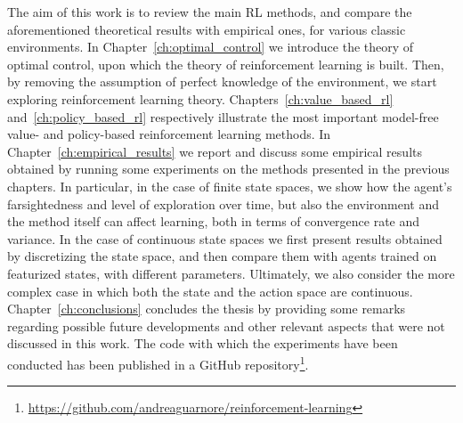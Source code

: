 The aim of this work is to review the main RL methods, and compare the aforementioned theoretical results with empirical ones, for various classic environments. In Chapter~\ref{ch:optimal_control} we introduce the theory of optimal control, upon which the theory of reinforcement learning is built. Then, by removing the assumption of perfect knowledge of the environment, we start exploring reinforcement learning theory. Chapters~\ref{ch:value_based_rl} and~\ref{ch:policy_based_rl} respectively illustrate the most important model-free value- and policy-based reinforcement learning methods. In Chapter~\ref{ch:empirical_results} we report and discuss some empirical results obtained by running some experiments on the methods presented in the previous chapters. In particular, in the case of finite state spaces, we show how the agent's farsightedness and level of exploration over time, but also the environment and the method itself can affect learning, both in terms of convergence rate and variance. In the case of continuous state spaces we first present results obtained by discretizing the state space, and then compare them with agents trained on featurized states, with different parameters. Ultimately, we also consider the more complex case in which both the state and the action space are continuous. Chapter~\ref{ch:conclusions} concludes the thesis by providing some remarks regarding possible future developments and other relevant aspects that were not discussed in this work. The code with which the experiments have been conducted has been published in a GitHub repository\footnote{\url{https://github.com/andreaguarnore/reinforcement-learning}}.
